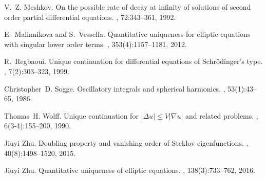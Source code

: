 \documentclass[11pt]{amsart}
\theoremstyle{plain}
\numberwithin{equation}{section}
\begin{document}
\begin{thebibliography}{BKRS88}
V.~Z. Meshkov.
\newblock On the possible rate of decay at infinity of solutions of second
  order partial differential equations.
, 72:343--361, 1992.

E.~Malinnikova and S.~Vessella.
\newblock Quantitative uniqueness for elliptic equations with singular lower
  order terms.
, 353(4):1157--1181, 2012.

R.~Regbaoui.
\newblock Unique continuation for differential equations of {S}chr{\"o}dinger's
  type.
, 7(2):303--323, 1999.

Christopher~D. Sogge.
\newblock Oscillatory integrals and spherical harmonics.
, 53(1):43--65, 1986.

Thomas~H. Wolff.
\newblock Unique continuation for {$\vert \Delta u\vert \le V\vert \nabla
  u\vert $} and related problems.
, 6(3-4):155--200, 1990.

Jiuyi Zhu.
\newblock Doubling property and vanishing order of {S}teklov eigenfunctions.
, 40(8):1498--1520, 2015.

Jiuyi Zhu.
\newblock Quantitative uniqueness of elliptic equations.
, 138(3):733--762, 2016.

\end{thebibliography}
\end{document}
